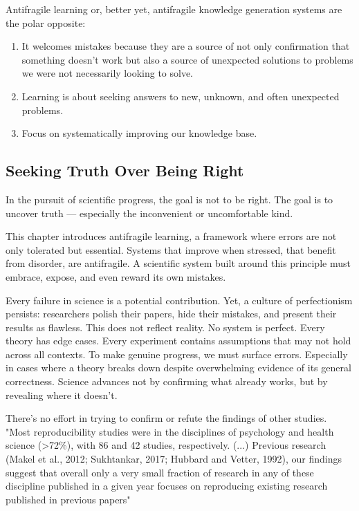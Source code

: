 Antifragile learning or, better yet, antifragile knowledge generation systems are the polar opposite:
\begin{enumerate}
	\item It welcomes mistakes because they are a source of not only confirmation that something doesn't work but also a source of unexpected solutions to problems we were not necessarily looking to solve.
	\item Learning is about seeking answers to new, unknown, and often unexpected problems.
	\item Focus on systematically improving our knowledge base.
\end{enumerate}


\subsection{Seeking Truth Over Being Right}

In the pursuit of scientific progress, the goal is not to be right. The goal is to uncover truth — especially the inconvenient or uncomfortable kind.

This chapter introduces antifragile learning, a framework where errors are not only tolerated but essential. Systems that improve when stressed,  that benefit from disorder, are antifragile. A scientific system built around this principle must embrace, expose, and even reward its own mistakes. 

Every failure in science is a potential contribution. Yet, a culture of perfectionism persists: researchers polish their papers, hide their mistakes, and present their results as flawless. This does not reflect reality. No system is perfect. Every theory has edge cases. Every experiment contains assumptions that may not hold across all contexts. To make genuine progress, we must surface errors. Especially in cases where a theory breaks down despite overwhelming evidence of its general correctness. Science advances not by confirming what already works, but by revealing where it doesn't.

There's no effort in trying to confirm or refute the findings of other studies. "Most reproducibility studies were in the disciplines of psychology and health science (>72\%), with 86 and 42 studies, respectively. (...) Previous research (Makel et al., 2012; Sukhtankar, 2017; Hubbard and Vetter, 1992), our findings suggest that overall only a very small fraction of research in any of these discipline published in a given year focuses on reproducing existing research published in previous papers" \cite{CobeyKelly2023}

